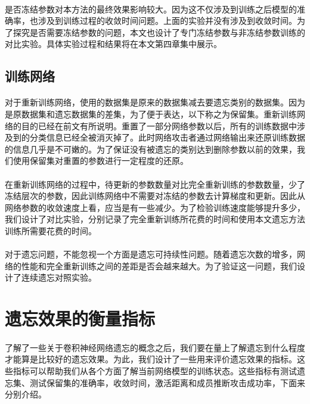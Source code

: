 \paragraph{}是否冻结参数对本方法的最终效果影响较大。因为这不仅涉及到训练之后模型的准确率，也涉及到训练过程的收敛时间问题。上面的实验并没有涉及到收敛时间。为了探究是否需要冻结参数的问题，本文也设计了专门冻结参数与非冻结参数训练的对比实验。具体实验过程和结果将在本文第四章集中展示。

\subsection{训练网络}
\paragraph{}对于重新训练网络，使用的数据集是原来的数据集减去要遗忘类别的数据集。因为是原数据集和遗忘数据集的差集，为了便于表达，以下称之为保留集。重新训练网络的目的已经在前文有所说明。重置了一部分网络参数以后，所有的训练数据中涉及到的分类信息已经全被消灭掉了。此时网络攻击者通过网络输出来还原训练数据的信息几乎是不可嫩的。为了保证没有被遗忘的类别达到删除参数以前的效果，我们使用保留集对重置的参数进行一定程度的还原。
\paragraph{}在重新训练网络的过程中，待更新的参数数量对比完全重新训练的参数数量，少了冻结层次的参数，因此训练网络中不需要对冻结的参数去计算梯度和更新。因此从网络参数的收敛速度上看，应当是有一些减少。为了检验训练速度能够提升多少，我们设计了对比实验，分别记录了完全重新训练所花费的时间和使用本文遗忘方法训练所需要花费的时间。
\paragraph{}对于遗忘问题，不能忽视一个方面是遗忘可持续性问题。随着遗忘次数的增多，网络的性能和完全重新训练之间的差距是否会越来越大。为了验证这一问题，我们设计了连续遗忘对照实验。

\section{遗忘效果的衡量指标}
\paragraph{}了解了一些关于卷积神经网络遗忘的概念之后，我们要在量上了解遗忘到什么程度才能算是比较好的遗忘效果。为此，我们设计了一些用来评价遗忘效果的指标。这些指标可以帮助我们从各个方面了解当前网络模型的训练状态。这些指标有测试遗忘集、测试保留集的准确率，收敛时间，激活距离和成员推断攻击成功率，下面来分别介绍。
